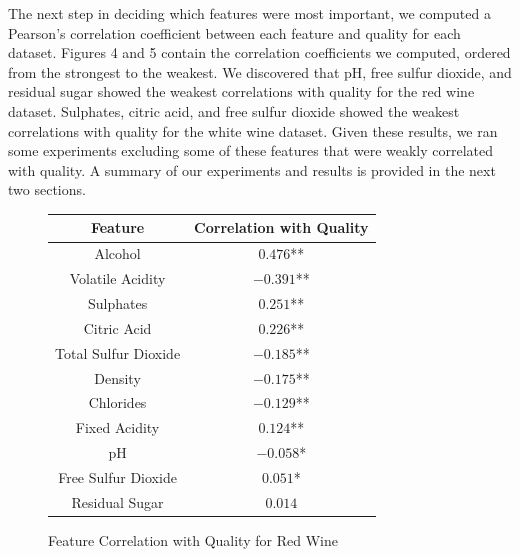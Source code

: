   
The next step in deciding which features were most important, we computed a Pearson's correlation coefficient between each feature and quality for each dataset. Figures 4 and 5 contain the correlation coefficients we computed, ordered from the strongest to the weakest. We discovered that pH, free sulfur dioxide, and residual sugar showed the weakest correlations with quality for the red wine dataset. Sulphates, citric acid, and free sulfur dioxide showed the weakest correlations with quality for the white wine dataset. Given these results, we ran some experiments excluding some of these features that were weakly correlated with quality. A summary of our experiments and results is provided in the next two sections.
\begin{figure}[htb]
  \centering %

 \begin{tabular}{|c|c|} 
   \hline \hline %
    Feature & Correlation with Quality \\ %
    \hline %
    Alcohol & $0.476$** \\
     \hline
    Volatile Acidity & $-0.391$** \\
     \hline
    Sulphates & $0.251$** \\
     \hline
    Citric Acid   & $0.226$** \\
     \hline
    Total Sulfur Dioxide  & $-0.185$** \\
     \hline
    Density  & $-0.175$** \\
     \hline
    Chlorides & $-0.129$** \\
     \hline
    Fixed Acidity  & $0.124$** \\
     \hline
    pH  & $-0.058$* \\
     \hline
    Free Sulfur Dioxide    & $0.051$* \\
     \hline
    Residual Sugar   & $0.014$ \\
  
    \hline \hline  
    \end{tabular}
  \caption{Feature Correlation with Quality for Red Wine}
  \label{tab:example}

\end{figure}

